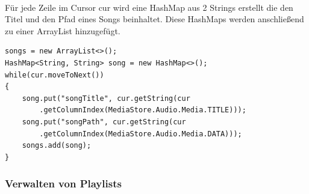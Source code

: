 \documentclass[FIPLY_base.tex]{subfiles}
\begin{document}
\newpage
\ \\
Für jede Zeile im Cursor cur wird eine HashMap aus 2 Strings erstellt die den Titel und den Pfad eines Songs beinhaltet. Diese HashMaps werden anschließend zu einer ArrayList hinzugefügt.
\begin{lstlisting}[caption={Speichern der Songverweise in eine ArrayList von HashMaps},label=DescriptiveLabel]
songs = new ArrayList<>();
HashMap<String, String> song = new HashMap<>();
while(cur.moveToNext())
{
	song.put("songTitle", cur.getString(cur
		.getColumnIndex(MediaStore.Audio.Media.TITLE)));
	song.put("songPath", cur.getString(cur
		.getColumnIndex(MediaStore.Audio.Media.DATA)));
	songs.add(song);
}
\end{lstlisting}


\subsubsection { Verwalten von Playlists}
\end{document}
